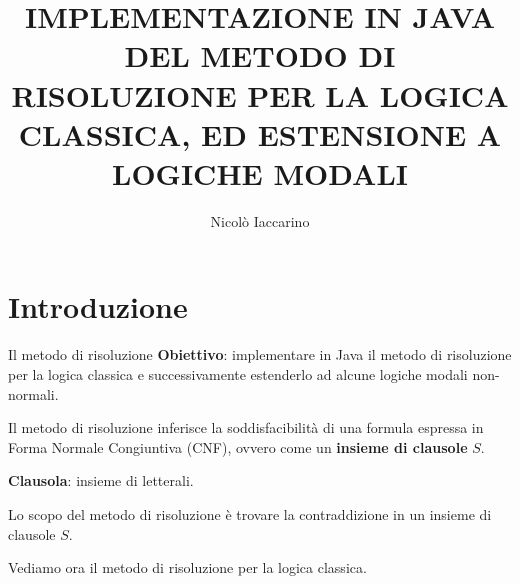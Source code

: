 \documentclass{beamer}
\title{IMPLEMENTAZIONE IN JAVA DEL METODO DI RISOLUZIONE PER LA LOGICA CLASSICA, ED ESTENSIONE A LOGICHE MODALI}
\author{Nicolò Iaccarino}
\begin{document}
\maketitle



\section{Introduzione}

\begin{frame}{Il metodo di risoluzione}
    \textbf{Obiettivo}: implementare in Java il metodo di risoluzione per la logica classica e successivamente estenderlo ad alcune logiche modali non-normali.

    \vspace{10px}

    Il metodo di risoluzione inferisce la soddisfacibilità di una formula espressa in Forma Normale Congiuntiva (CNF), ovvero come un \textbf{insieme di clausole} $S$.

    \textbf{Clausola}: insieme di letterali.

    \vspace{10px}

    Lo scopo del metodo di risoluzione è trovare la contraddizione in un insieme di clausole $S$.

    \vspace{10px}

    Vediamo ora il metodo di risoluzione per la logica classica.
\end{frame}
\end{document}

